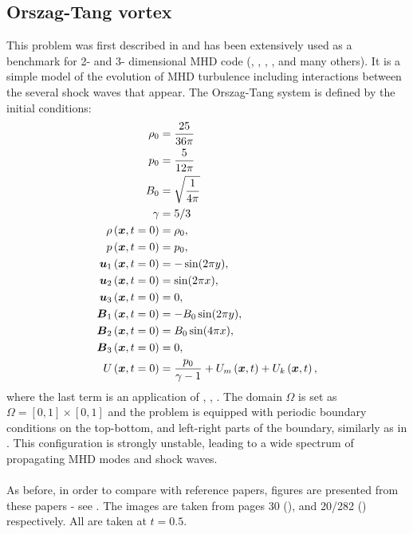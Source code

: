 \subsection{Orszag-Tang vortex}
This problem was first described in \cite{vortex} and has been extensively used as a benchmark for 2- and 3- dimensional MHD code (\cite{blast0}, \cite{blast1}, \cite{honzaFem}, \cite{otnew}, and many others). It is a simple model of the evolution of MHD turbulence including interactions between the several shock waves that appear. The Orszag-Tang system is defined by the initial conditions:
\begin{align}
\rho_0 & =  \frac{25}{36 \pi}\\ \nonumber
p_0 & =  \frac{5}{12 \pi}\\  \nonumber
B_0 & =  \sqrt{\frac{1}{4 \pi}}\\ \nonumber
\gamma & =  5 / 3\\ \nonumber
\rho\left(\mbox{\boldmath $x$}, t = 0\right) & =  \rho_0,\\ \nonumber
p\left(\mbox{\boldmath $x$}, t = 0\right) & =  p_0,\\ \nonumber
\mbox{\boldmath $u$}_1\left(\mbox{\boldmath $x$}, t = 0\right) & =  -\sin(2 \pi y),\\ \nonumber
\mbox{\boldmath $u$}_2\left(\mbox{\boldmath $x$}, t = 0\right) & =  \sin(2 \pi x),\\ \nonumber
\mbox{\boldmath $u$}_3\left(\mbox{\boldmath $x$}, t = 0\right) & =  0,\\ \nonumber
\mbox{\boldmath $B$}_1\left(\mbox{\boldmath $x$}, t = 0\right) & =  -B_0 \sin(2 \pi y),\\ \nonumber
\mbox{\boldmath $B$}_2\left(\mbox{\boldmath $x$}, t = 0\right) & =  B_0 \sin(4 \pi x),\\ \nonumber
\mbox{\boldmath $B$}_3\left(\mbox{\boldmath $x$}, t = 0\right) & =  0,\\ \nonumber
U\left(\mbox{\boldmath $x$}, t = 0\right) & =  \frac{p_0}{\gamma - 1} + U_m\left(\mbox{\boldmath $x$}, t\right) + U_k\left(\mbox{\boldmath $x$}, t\right),
\end{align}
where the last term is an application of , , . The domain $\Omega$ is set as $\Omega = [0, 1] \times [0, 1]$ and the problem is equipped with periodic boundary conditions on the top-bottom, and left-right parts of the boundary, similarly as in . This configuration is strongly unstable, leading to a wide spectrum of propagating MHD modes and shock waves.
\paragraph{}
As before, in order to compare with reference papers, figures are presented from these papers - see . The images are taken from pages 30 (\cite{blast1}), and 20/282 (\cite{blast0}) respectively. All are taken at $t = 0.5$.

